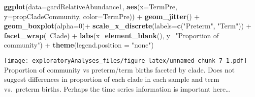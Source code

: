 \documentclass[]{article}
\newenvironment{Shaded}{\begin{snugshade}}{\end{snugshade}}
\newcommand{\KeywordTok}[1]{\textcolor[rgb]{0.13,0.29,0.53}{\textbf{{#1}}}}
\newcommand{\DataTypeTok}[1]{\textcolor[rgb]{0.13,0.29,0.53}{{#1}}}
\newcommand{\DecValTok}[1]{\textcolor[rgb]{0.00,0.00,0.81}{{#1}}}
\newcommand{\StringTok}[1]{\textcolor[rgb]{0.31,0.60,0.02}{{#1}}}
\newcommand{\NormalTok}[1]{{#1}}
\begin{document}
\begin{Shaded}
\begin{Highlighting}[]
\KeywordTok{ggplot}\NormalTok{(}\DataTypeTok{data=}\NormalTok{gardRelativeAbundance1, }\KeywordTok{aes}\NormalTok{(}\DataTypeTok{x=}\NormalTok{TermPre, }\DataTypeTok{y=}\NormalTok{propCladeCommunity, }\DataTypeTok{color=}\NormalTok{TermPre)) +}
\StringTok{  }\KeywordTok{geom_jitter}\NormalTok{() +}
\StringTok{  }\KeywordTok{geom_boxplot}\NormalTok{(}\DataTypeTok{alpha=}\DecValTok{0}\NormalTok{)+}
\StringTok{  }\KeywordTok{scale_x_discrete}\NormalTok{(}\DataTypeTok{labels=}\KeywordTok{c}\NormalTok{(}\StringTok{"Preterm"}\NormalTok{, }\StringTok{"Term"}\NormalTok{)) +}
\StringTok{  }\KeywordTok{facet_wrap}\NormalTok{(~Clade) +}
\StringTok{  }\KeywordTok{labs}\NormalTok{(}\DataTypeTok{x=}\KeywordTok{element_blank}\NormalTok{(), }\DataTypeTok{y=}\StringTok{"Proportion of community"}\NormalTok{) +}
\StringTok{  }\KeywordTok{theme}\NormalTok{(}\DataTypeTok{legend.position =} \StringTok{"none"}\NormalTok{)}
\end{Highlighting}
\end{Shaded}

\texttt{[image: exploratoryAnalyses\_files/figure-latex/unnamed-chunk-7-1.pdf]}
\n Proportion of community vs preterm/term births faceted by clade. Does
not suggest differences in proportion of each clade in each sample and
term vs.~preterm births. Perhaps the time series information is
important here\ldots{}

\begin{Shaded}
\end{Shaded}
\end{document}
